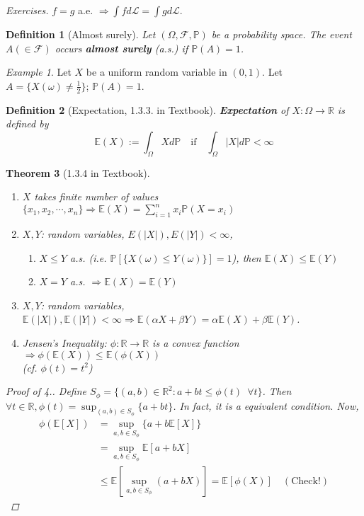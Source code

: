 \documentclass[12pt]{report}
\renewcommand{\1}{\mathbb{1}}
\theoremstyle{break}
\newtheorem{thm}{Theorem}[section] %
\theoremstyle{newdef}
\newtheorem{defn}[thm]{Definition} %
\theoremstyle{remark}
\newtheorem*{exmp}{Example} %
\begin{document}
\textit{Exercises.} $f = g$ a.e. $\Rightarrow \int fd\mathcal{L} = \int g d\mathcal{L}$.

\begin{defn}[Almost surely]
Let $(\Omega, \mathcal{F}, \mathbb{P})$ be a probability space.
The event $A (\in \mathcal{F})$ occurs \textbf{almost surely} (a.s.) if $\mathbb{P}(A) = 1$.
\end{defn}

\begin{exmp}
Let $X$ be a uniform random variable in $(0,1)$.
Let $A = \{ X(\omega) \neq \frac{1}{2}\}$; $\mathbb{P}(A) = 1$.
\end{exmp}



\begin{defn}[Expectation, 1.3.3. in Textbook]
\textbf{Expectation} of $X : \Omega \rightarrow \mathbb{R}$ is defined by
$$\mathbb{E}(X) := \int_\Omega X d\mathbb{P} \quad \text{if} \quad \int_{\Omega}|X|d\mathbb{P} < \infty$$ 
\end{defn}

\begin{thm}[1.3.4 in Textbook]
\leavevmode
\vspace{-6mm}
\begin{enumerate}
\item $X$ takes finite number of values $\{x_1,x_2, \cdots, x_n\} \Rightarrow \mathbb{E}(X) = \sum_{i=1}^n x_i\mathbb{P}(X = x_i)$
\item $X, Y$: random variables, $E(|X|), E(|Y|) < \infty$,
\begin{enumerate}[label = (\roman*)]
\item $X \leq Y$ a.s. (i.e. $\mathbb{P}[\{X(\omega) \leq Y(\omega)\}]=1$), then $\mathbb{E}(X) \leq \mathbb{E}(Y)$
\item $X = Y$ a.s. $\Rightarrow \mathbb{E}(X) = \mathbb{E}(Y)$
\end{enumerate}
\item $X, Y$: random variables, $\mathbb{E}(|X|), \mathbb{E}(|Y|) < \infty \Rightarrow \mathbb{E}(\alpha X + \beta Y) = \alpha \mathbb{E}(X) + \beta \mathbb{E}(Y)$.
\item Jensen's Inequality: $\phi : \mathbb{R} \rightarrow \mathbb{R}$ is a convex function $\Rightarrow \phi(\mathbb{E}(X)) \leq \mathbb{E}(\phi(X))$\\
(\textit{cf.} $\phi(t) = t^2$)
\end{enumerate}

\begin{proof}[Proof of 4.]
Define $S_\phi = \{(a,b) \in \mathbb{R}^2 : a + bt \leq \phi(t) \enspace \forall t\}$.
Then $\forall t \in \mathbb{R}, \phi(t) = \sup_{(a,b) \in S_\phi} \{a+bt\}$.
In fact, it is a equivalent condition. Now,
$$
\begin{aligned}
\phi(\mathbb{E}[X]) &= \sup_{a,b\in S_\phi} \{a + b\mathbb{E}[X]\}\\
&= \sup_{a,b \in S_\phi} \mathbb{E}[a+bX]\\
&\leq \mathbb{E}[\sup_{a,b\in S_\phi}(a+bX)] = \mathbb{E}[\phi(X)] \quad (\text{Check!})
\end{aligned}
$$
\end{proof}
\end{thm}
\end{document}
